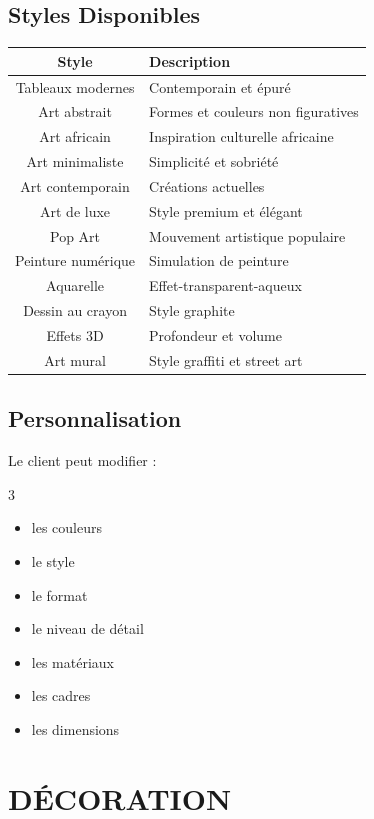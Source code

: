 \documentclass[12pt,a4paper,oneside]{book}
\begin{document}
\section{Styles Disponibles}
\begin{center}
\begin{tabular}{|c|p{10cm}|}
\hline
\rowcolor{electronpurple}
\color{white}\textbf{Style} & \color{white}\textbf{Description} \\
\hline
Tableaux modernes & Contemporain et épuré \\
\hline
Art abstrait & Formes et couleurs non figuratives \\
\hline
Art africain & Inspiration culturelle africaine \\
\hline
Art minimaliste & Simplicité et sobriété \\
\hline
Art contemporain & Créations actuelles \\
\hline
Art de luxe & Style premium et élégant \\
\hline
Pop Art & Mouvement artistique populaire \\
\hline
Peinture numérique & Simulation de peinture \\
\hline
Aquarelle & Effet-transparent-aqueux \\
\hline
Dessin au crayon & Style graphite \\
\hline
Effets 3D & Profondeur et volume \\
\hline
Art mural & Style graffiti et street art \\
\hline
\end{tabular}
\end{center}

\section{Personnalisation}
Le client peut modifier :
\begin{multicols}{3}
\begin{itemize}
\item les couleurs
\item le style
\item le format
\item le niveau de détail
\item les matériaux
\item les cadres
\item les dimensions
\end{itemize}
\end{multicols}

\chapter{DÉCORATION}
\end{document}
